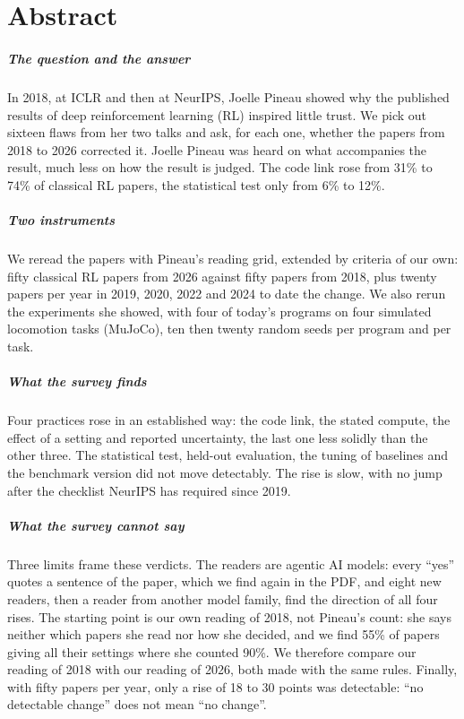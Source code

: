 \chapter*{Abstract}\label{chap:00-resume}

\paragraph{The question and the answer}
In 2018, at ICLR and then at NeurIPS, Joelle Pineau showed why the published results of deep
reinforcement learning (RL) inspired little trust. We pick out sixteen flaws from her two talks and ask,
for each one, whether the papers from 2018 to 2026 corrected it. Joelle Pineau was heard on what accompanies the result, much less on how the result is judged. The
code link rose from 31\% to 74\% of classical RL papers, the statistical test only from 6\% to 12\%.

\paragraph{Two instruments}
We reread the papers with Pineau's reading grid, extended by criteria of our own: fifty classical RL papers from 2026 against fifty papers from 2018, plus twenty papers per year in
2019, 2020, 2022 and 2024 to date the change. We also rerun the experiments she showed, with four of today's programs on four simulated locomotion
tasks (MuJoCo), ten then twenty random seeds per program and per task.

\paragraph{What the survey finds}
Four practices rose in an established way: the code link, the stated compute, the effect of a
setting and reported uncertainty, the last one less solidly than the other three. The statistical test, held-out evaluation, the tuning of
baselines and the benchmark version did not move detectably. The rise is slow, with no jump after the
checklist NeurIPS has required since 2019.

\paragraph{What the survey cannot say}
Three limits frame these verdicts. The readers are agentic AI models: every \enquote{yes} quotes a sentence of the paper,
which we find again in the PDF, and eight new readers, then a reader from another model
family, find the direction of all four rises. The starting point is our own reading of 2018, not
Pineau's count: she says neither which papers she read nor how she decided, and we find 55\% of papers giving all their
settings where she counted 90\%. We therefore compare our reading of 2018 with our
reading of 2026, both made with the same rules. Finally,
with fifty papers per year, only a rise of 18 to 30 points was detectable: \enquote{no detectable
change} does not mean \enquote{no change}.

